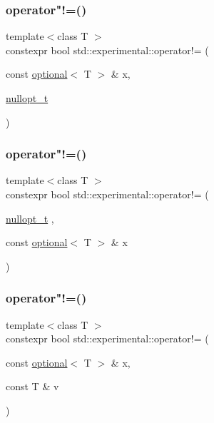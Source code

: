\subsubsection{\texorpdfstring{operator"!=()}{operator!=()}\hspace{0.1cm}{\footnotesize\ttfamily [2/9]}}
{\footnotesize\ttfamily template$<$class T $>$ \\
constexpr bool std\+::experimental\+::operator!= (\begin{DoxyParamCaption}\item[{const \hyperlink{classstd_1_1experimental_1_1optional}{optional}$<$ T $>$ \&}]{x,  }\item[{\hyperlink{structstd_1_1experimental_1_1nullopt__t}{nullopt\+\_\+t}}]{ }\end{DoxyParamCaption})\hspace{0.3cm}{\ttfamily [noexcept]}}

\mbox{\label{namespacestd_1_1experimental_aa340c9c2a57fd083695e470ded11c089}} 
\subsubsection{\texorpdfstring{operator"!=()}{operator!=()}\hspace{0.1cm}{\footnotesize\ttfamily [3/9]}}
{\footnotesize\ttfamily template$<$class T $>$ \\
constexpr bool std\+::experimental\+::operator!= (\begin{DoxyParamCaption}\item[{\hyperlink{structstd_1_1experimental_1_1nullopt__t}{nullopt\+\_\+t}}]{,  }\item[{const \hyperlink{classstd_1_1experimental_1_1optional}{optional}$<$ T $>$ \&}]{x }\end{DoxyParamCaption})\hspace{0.3cm}{\ttfamily [noexcept]}}

\mbox{\label{namespacestd_1_1experimental_a65194017839ffdd2eeeb2f8f510d9a84}} 
\subsubsection{\texorpdfstring{operator"!=()}{operator!=()}\hspace{0.1cm}{\footnotesize\ttfamily [4/9]}}
{\footnotesize\ttfamily template$<$class T $>$ \\
constexpr bool std\+::experimental\+::operator!= (\begin{DoxyParamCaption}\item[{const \hyperlink{classstd_1_1experimental_1_1optional}{optional}$<$ T $>$ \&}]{x,  }\item[{const T \&}]{v }\end{DoxyParamCaption})}


